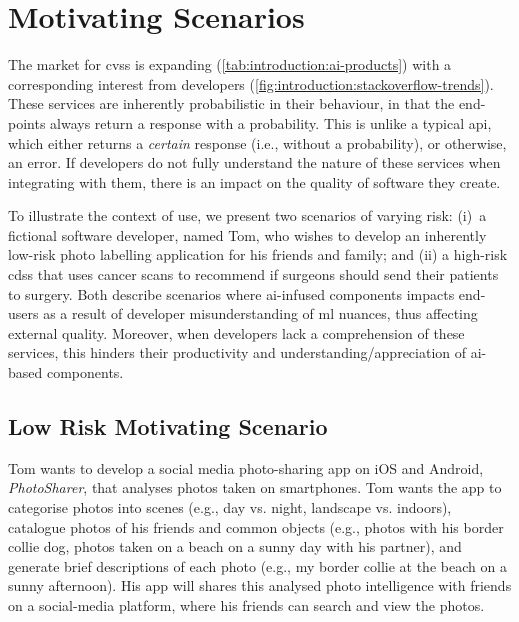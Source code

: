 
\section{Motivating Scenarios}
\label{ssec:introduction:motivation}

The market for \glspl{cvs} is expanding (\cref{tab:introduction:ai-products}) with a corresponding interest from developers (\cref{fig:introduction:stackoverflow-trends}). These services are inherently probabilistic in their behaviour, in that the end-points always return a response with a probability. This is unlike a typical \gls{api}, which either returns a \textit{certain} response (i.e., without a probability), or otherwise, an error.  If developers do not fully understand the nature of these services when integrating with them, there is an impact on the quality of software they create.

To illustrate the context of use, we present two scenarios of varying risk: (i)~a fictional software developer, named Tom, who wishes to develop an inherently low-risk photo labelling application for his friends and family; and (ii) a high-risk \gls{cdss} that uses cancer scans to recommend if surgeons should send their patients to surgery. Both describe scenarios where \gls{ai}-infused components impacts end-users as a result of developer misunderstanding of \gls{ml} nuances, thus affecting external quality. Moreover, when developers lack a comprehension of these services, this hinders their productivity and understanding/appreciation of \gls{ai}-based components.
  
\subsection{Low Risk Motivating Scenario}
\label{ssec:introduction:motivation:scenario:pam}

Tom wants to develop a social media photo-sharing app on iOS and Android, \textit{PhotoSharer}, that analyses photos taken on smartphones. Tom wants the app to categorise photos into scenes (e.g., day vs. night, landscape vs. indoors), catalogue photos of his friends and common objects (e.g., photos with his border collie dog, photos taken on a beach on a sunny day with his partner), and generate brief descriptions of each photo (e.g., my border collie at the beach on a sunny afternoon). His app will shares this analysed photo intelligence with friends on a social-media platform, where his friends can search and view the photos.

